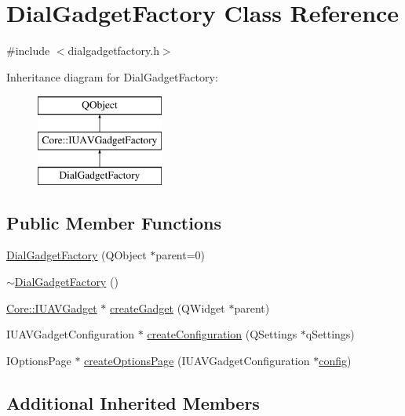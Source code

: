 \hypertarget{class_dial_gadget_factory}{\section{Dial\-Gadget\-Factory Class Reference}
\label{class_dial_gadget_factory}
}


{\ttfamily \#include $<$dialgadgetfactory.\-h$>$}

Inheritance diagram for Dial\-Gadget\-Factory\-:\begin{figure}[H]
\begin{center}
\leavevmode
\includegraphics[height=3.000000cm]{class_dial_gadget_factory}
\end{center}
\end{figure}
\subsection*{Public Member Functions}
\begin{DoxyCompactItemize}
\item 
\hyperlink{group___dial_plugin_ga96aa76f96e82147d1054198b8e5baccc}{Dial\-Gadget\-Factory} (Q\-Object $\ast$parent=0)
\item 
\hyperlink{group___dial_plugin_gaa1a6c5c829367397107f9bf058d3838f}{$\sim$\-Dial\-Gadget\-Factory} ()
\item 
\hyperlink{class_core_1_1_i_u_a_v_gadget}{Core\-::\-I\-U\-A\-V\-Gadget} $\ast$ \hyperlink{group___dial_plugin_gaa66ae505f320ed3092d13c52533951fb}{create\-Gadget} (Q\-Widget $\ast$parent)
\item 
I\-U\-A\-V\-Gadget\-Configuration $\ast$ \hyperlink{group___dial_plugin_ga19fedc047658860b63df440fcd9d58c0}{create\-Configuration} (Q\-Settings $\ast$q\-Settings)
\item 
I\-Options\-Page $\ast$ \hyperlink{group___dial_plugin_gabea23502f0a1a7c8b37131c0a24faeb8}{create\-Options\-Page} (I\-U\-A\-V\-Gadget\-Configuration $\ast$\hyperlink{deflate_8c_a4473b5227787415097004fd39f55185e}{config})
\end{DoxyCompactItemize}
\subsection*{Additional Inherited Members}


